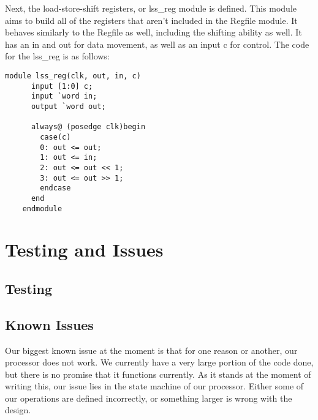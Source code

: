 \documentclass[journal]{IEEEtran}
\begin{document}
	Next, the load\--store\--shift registers, or lss\_reg module is defined. This module aims to build all of the registers that aren't included in the Regfile module. It behaves similarly to the Regfile as well, including the shifting ability as well. It has an in and out for data movement, as well as an input c for control. The code for the lss\_reg is as follows:
	
	\begin{Verbatim}[fontsize=\small]
	module lss_reg(clk, out, in, c)
	  input [1:0] c;
	  input `word in;
	  output `word out;
	
	  always@ (posedge clk)begin
	    case(c)
		0: out <= out;
		1: out <= in;
		2: out <= out << 1;
		3: out <= out >> 1;
		endcase
	  end
	endmodule
	\end{Verbatim}
	
	
	
\section{Testing and Issues}
\subsection{Testing}


\subsection{Known Issues}
	Our biggest known issue at the moment is that for one reason or another, our processor does not work. We currently have a very large portion of the code done, but there is no promise that it functions currently. As it stands at the moment of writing this, our issue lies in the state machine of our processor. Either some of our operations are defined incorrectly, or something larger is wrong with the design. 
\end{document}
